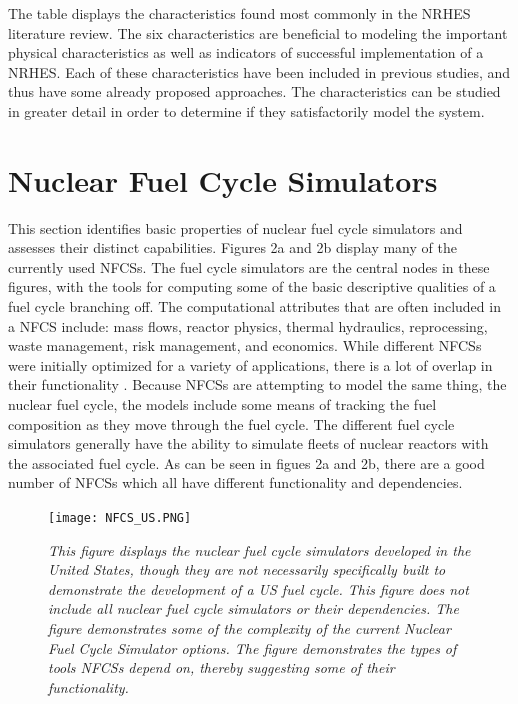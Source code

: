 \documentclass{article}                                                                           %
\begin{document}
\begin{linenumbers}
The table displays the characteristics found most commonly in the NRHES literature review.  The six characteristics are beneficial to modeling the important physical characteristics as well as indicators of successful implementation of a NRHES.  Each of these characteristics have been included in previous studies, and thus have some already proposed approaches.  The characteristics can be studied in greater detail in order to determine if they satisfactorily model the system.

\section{Nuclear Fuel Cycle Simulators}

This section identifies basic properties of nuclear fuel cycle simulators and assesses their distinct capabilities. Figures 2a and 2b display many of the currently used NFCSs. The fuel cycle simulators are the central nodes in these figures, with the tools for computing some of the basic descriptive qualities of a fuel cycle branching off. The computational attributes that are often included in a NFCS include: mass flows, reactor physics, thermal hydraulics, reprocessing, waste management, risk management, and economics. While different NFCSs were initially optimized for a variety of applications, there is a lot of overlap in their functionality \cite {Guerin2009}. Because NFCSs are attempting to model the same thing, the nuclear fuel cycle, the models include some means of tracking the fuel composition as they move through the fuel cycle. The different fuel cycle simulators generally have the ability to simulate fleets of nuclear reactors with the associated fuel cycle. As can be seen in figues 2a and 2b, there are a good number of NFCSs which all have different functionality and dependencies.

\begin{subfigures}
\begin{figure}
\texttt{[image: NFCS\_US.PNG]}
\caption{\small \sl This figure displays the nuclear fuel cycle simulators developed in the United States, though they are not necessarily specifically built to demonstrate the development of a US fuel cycle. This figure does not include all nuclear fuel cycle simulators or their dependencies.  The figure demonstrates some of the complexity of the current Nuclear Fuel Cycle Simulator options. The figure demonstrates the types of tools NFCSs depend on, thereby suggesting some of their functionality.}
\end{figure}


\end{subfigures}
\end{linenumbers}
\end{document}

